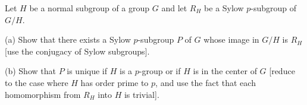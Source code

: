 Let $H$ be a normal subgroup of a group $G$ and let $R_H$ be a Sylow $p$-subgroup of $G/H$.

(a) Show that there exists a Sylow $p$-subgroup $P$ of $G$ whose image in $G/H$ is $R_H$ [use the conjugacy of Sylow subgroups].

(b) Show that $P$ is unique if $H$ is a $p$-group or if $H$ is in the center of $G$ [reduce to the case where $H$ has order prime to $p$, and use the fact that each homomorphism from $R_H$ into $H$ is trivial].
